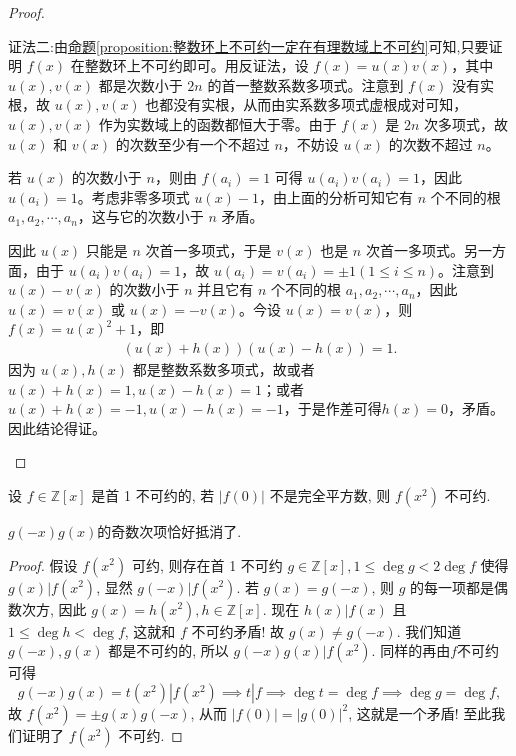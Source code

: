 \documentclass[../../main.tex]{subfiles}%
\begin{document}
\begin{proof}
\begin{enumerate}
{\color{blue}证法二:}由\hyperref[proposition:整数环上不可约一定在有理数域上不可约]{命题\ref{proposition:整数环上不可约一定在有理数域上不可约}}可知,只要证明 $f(x)$ 在整数环上不可约即可。用反证法，设 $f(x) = u(x)v(x)$，其中 $u(x), v(x)$ 都是次数小于 $2n$ 的首一整数系数多项式。注意到 $f(x)$ 没有实根，故
$u(x), v(x)$
也都没有实根，从而由实系数多项式虚根成对可知，$u(x), v(x)$ 作为实数域上的函数都恒大于零。由于 $f(x)$ 是 $2n$ 次多项式，故 $u(x)$ 和 $v(x)$ 的次数至少有一个不超过 $n$，不妨设 $u(x)$ 的次数不超过 $n$。

若 $u(x)$ 的次数小于 $n$，则由 $f(a_i) = 1$ 可得 $u(a_i)v(a_i) = 1$，因此 $u(a_i) = 1$。考虑非零多项式 $u(x) - 1$，由上面的分析可知它有 $n$ 个不同的根 $a_1, a_2, \cdots, a_n$，这与它的次数小于 $n$ 矛盾。

因此 $u(x)$ 只能是 $n$ 次首一多项式，于是 $v(x)$ 也是 $n$ 次首一多项式。另一方面，由于 $u(a_i)v(a_i) = 1$，故 $u(a_i) = v(a_i) = \pm 1 (1 \leqslant  i \leqslant  n)$。注意到 $u(x) - v(x)$ 的次数小于 $n$ 并且它有 $n$ 个不同的根 $a_1, a_2, \cdots, a_n$，因此 $u(x) = v(x)$ 或 $u(x) = -v(x)$。今设 $u(x) = v(x)$，则 $f(x) = u(x)^2 + 1$，即
\begin{align*}
(u(x) + h(x))(u(x) - h(x)) = 1.
\end{align*}
因为 $u(x), h(x)$ 都是整数系数多项式，故或者 $u(x) + h(x) = 1, u(x) - h(x) = 1$；或者 $u(x) + h(x) = -1, u(x) - h(x) = -1$，于是作差可得$h(x) = 0$，矛盾。因此结论得证。
\end{enumerate}

\end{proof}

\begin{example}\label{example:不可约多项式证明例题11}
设 \( f \in \mathbb{Z}[x] \) 是首 1 不可约的, 若 \( |f(0)| \) 不是完全平方数, 则 \( f(x^2) \) 不可约.
\end{example}
\begin{remark}
$g(-x)g(x)$的奇数次项恰好抵消了.
\end{remark}
\begin{proof}

假设 \( f(x^2) \) 可约, 则存在首 1 不可约 \( g \in \mathbb{Z}[x], 1 \leqslant \deg g < 2\deg f \) 使得 \( g(x)|f(x^2) \), 显然 \( g(-x)|f(x^2) \). 若 \( g(x) = g(-x) \), 则 \( g \) 的每一项都是偶数次方, 因此 \( g(x) = h(x^2), h \in \mathbb{Z}[x] \). 现在 \( h(x)|f(x) \) 且 \( 1 \leqslant \deg h < \deg f \), 这就和 \( f \) 不可约矛盾! 故 \( g(x) \neq g(-x) \). 我们知道 \( g(-x), g(x) \) 都是不可约的, 所以 \( g(-x)g(x)|f(x^2) \). 同样的再由$f$不可约可得
\[
g(-x)g(x) = t(x^2)|f(x^2) \implies t|f \implies \deg t = \deg f \implies \deg g = \deg f,
\]
故 \( f(x^2) = \pm g(x)g(-x) \), 从而 \( |f(0)| = |g(0)|^2 \), 这就是一个矛盾! 至此我们证明了 \( f(x^2) \) 不可约.

\end{proof}
\end{document}
